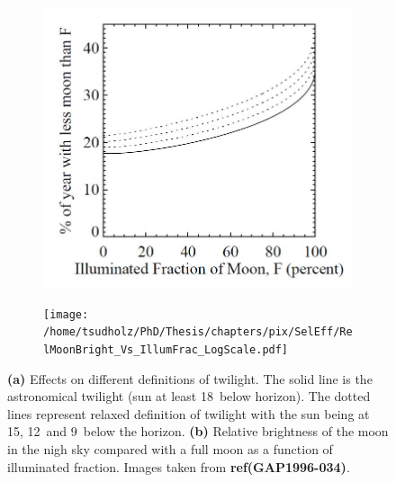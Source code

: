 \begin{figure}
\centering
\begin{subfigure}[b]{0.42\textwidth}
\includegraphics[width=\textwidth]{chapters/pix/SelEff/IlluminatedMoonFrac_Twilight.JPG}
\caption{}
\end{subfigure}
\hspace*{3mm}
\begin{subfigure}[b]{0.48\textwidth}
\texttt{[image: /home/tsudholz/PhD/Thesis/chapters/pix/SelEff/RelMoonBright\_Vs\_IllumFrac\_LogScale.pdf]}
\caption{}
\end{subfigure}
\caption{\textbf{(a)} Effects on different definitions of twilight. The solid line is the astronomical twilight (sun at least 18\textdegree \ below horizon). The dotted lines represent relaxed definition of twilight with the sun being at 15\textdegree , 12\textdegree \ and 9\textdegree \ below the horizon. \textbf{(b)} Relative brightness of the moon in the nigh sky compared with a full moon as a function of illuminated fraction. Images taken from \textbf{ref{(GAP1996-034)}}. }
\end{figure}

